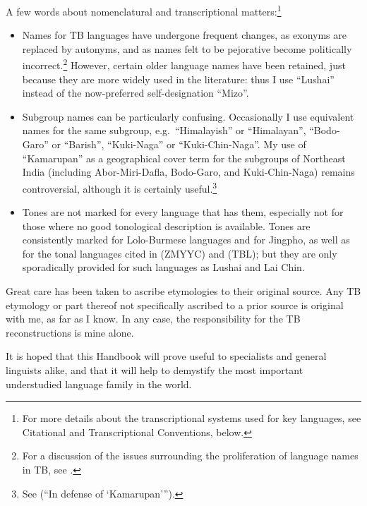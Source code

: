 A few words about nomenclatural and transcriptional matters:\footnote{For more details about the transcriptional systems used for key languages, see Citational and Transcriptional Conventions, below.}
\begin{itemize}

\item Names for TB languages have undergone frequent changes, as exonyms are replaced by autonyms, and as names felt to be pejorative become politically incorrect.\footnote{For a discussion of the issues surrounding the proliferation of language names in TB, see \citealt{JAM-LDTB}.} However, certain older language names have been retained, just because they are more widely used in the literature: thus I use “Lushai” instead of the now-preferred self-designation “Mizo”.
\item Subgroup names can be particularly confusing. Occasionally I use equivalent names for the same subgroup, e.g.\ “Himalayish” or “Himalayan”, “Bodo-Garo” or “Barish”, “Kuki-Naga” or “Kuki-Chin-Naga”. My use of “Kamarupan” as a geographical cover term for the subgroups of Northeast India (including Abor-Miri-Dafla, Bodo-Garo, and Kuki-Chin-Naga) remains controversial, although it is certainly useful.\footnote{See \citealt{JAM-IDK} (“In defense of ‘Kamarupan’\thinspace”).}
\item Tones are not marked for every language that has them, especially not for those where no good tonological description is available. Tones are consistently marked for Lolo-Burmese languages and for Jingpho, as well as for the tonal languages cited in \citealt{ZMYYC} (ZMYYC) and \citealt{TBL} (TBL); but they are only sporadically provided for such languages as Lushai and Lai Chin.
\end{itemize}

Great care has been taken to ascribe etymologies to their original source. Any TB etymology or part thereof not specifically ascribed to a prior source is original with me, as far as I know. In any case, the responsibility for the TB reconstructions is mine alone.

It is hoped that this Handbook will prove useful to specialists and general linguists alike, and that it will help to demystify the most important understudied language family in the world.